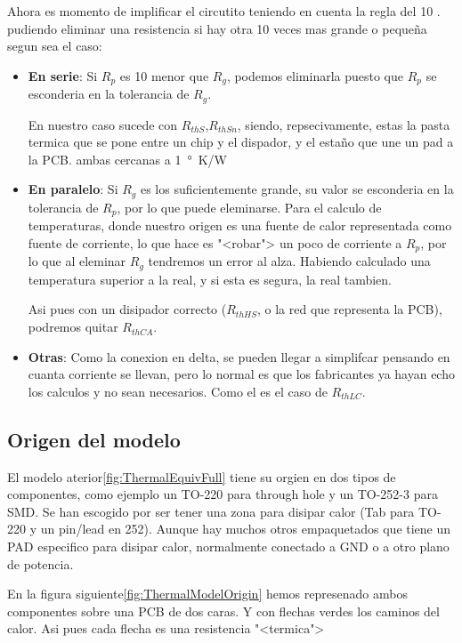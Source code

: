 Ahora es momento de implificar el circutito teniendo en cuenta la regla del 10
. pudiendo eliminar una resistencia
si hay otra 10 veces mas grande o pequeña segun sea el caso:
\begin{itemize}
    \item \textbf{En serie}: Si $R_p$ es 10 menor que $R_g$, podemos eliminarla puesto que 
    $R_p$ se esconderia en la tolerancia de $R_g$.

    En nuestro caso sucede con $R_{thS}$,$R_{thSn}$, siendo, repsecivamente, estas la pasta
    termica que se pone entre un chip y el dispador, y el estaño que une un pad a la PCB.
    ambas cercanas a \SI{1}{\degree\kelvin/\watt}
    \item \textbf{En paralelo}: Si $R_g$ es los suficientemente grande, su valor se esconderia
    en la tolerancia de $R_p$, por lo que puede eleminarse. Para el calculo de temperaturas, donde nuestro
    origen es una fuente de calor representada como fuente de corriente, lo que hace es "<robar">
    un poco de corriente a $R_p$, por lo que al eleminar $R_g$ tendremos un error al alza. 
    Habiendo calculado una temperatura superior a la real, y si esta es segura, la real tambien.
    
    Asi pues con un disipador correcto ($R_{thHS}$, o la red que representa la PCB), podremos quitar
    $R_{thCA}$.
    \item \textbf{Otras}: Como la conexion en delta, se pueden llegar a simplifcar
    pensando en cuanta corriente se llevan, pero lo normal es que los fabricantes ya
    hayan echo los calculos y no sean necesarios. Como el es el caso de $R_{thLC}$.    
\end{itemize}

\subsection{Origen del modelo}

El modelo aterior\ref{fig:ThermalEquivFull} tiene su orgien en dos tipos de componentes, como ejemplo 
un TO-220 para through hole y un TO-252-3 para SMD. Se han escogido por ser tener una zona
para disipar calor (Tab para TO-220 y un pin/lead en 252). Aunque hay muchos otros empaquetados
que tiene un PAD especifico para disipar calor, normalmente conectado a GND o a otro
plano de potencia.

En la figura siguiente\ref{fig:ThermalModelOrigin} hemos represenado ambos componentes sobre una PCB
de dos caras. Y con flechas verdes los caminos del calor. Asi pues cada flecha es una resistencia "<termica">

